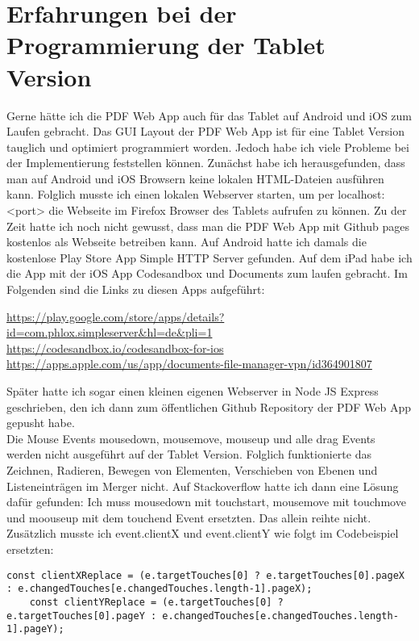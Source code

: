 \section{Erfahrungen bei der Programmierung der Tablet Version}
Gerne hätte ich die PDF Web App auch für das Tablet auf Android und iOS zum Laufen gebracht. Das GUI Layout der PDF Web App ist für eine Tablet Version tauglich und optimiert programmiert worden. Jedoch habe ich viele Probleme bei der Implementierung feststellen können. Zunächst habe ich herausgefunden, dass man auf Android und iOS Browsern keine lokalen HTML-Dateien ausführen kann. Folglich musste ich einen lokalen Webserver starten, um per localhost:<port> die Webseite im Firefox Browser des Tablets aufrufen zu können. Zu der Zeit hatte ich noch nicht gewusst, dass man die PDF Web App mit Github pages kostenlos als Webseite betreiben kann. Auf Android hatte ich damals die kostenlose Play Store App Simple HTTP Server gefunden. Auf dem iPad habe ich die App mit der iOS App Codesandbox und Documents zum laufen gebracht. Im Folgenden sind die Links zu diesen Apps aufgeführt:

\url{https://play.google.com/store/apps/details?id=com.phlox.simpleserver&hl=de&pli=1} \\
\url{https://codesandbox.io/codesandbox-for-ios} \\
\url{https://apps.apple.com/us/app/documents-file-manager-vpn/id364901807}

Später hatte ich sogar einen kleinen eigenen Webserver in Node JS Express geschrieben, den ich dann zum öffentlichen Github Repository der PDF Web App gepusht habe. \\
Die Mouse Events mousedown, mousemove, mouseup und alle drag Events werden nicht ausgeführt auf der Tablet Version. Folglich funktionierte das Zeichnen, Radieren, Bewegen von Elementen, Verschieben von Ebenen und Listeneinträgen im Merger nicht. Auf Stackoverflow hatte ich dann eine Lösung dafür gefunden: Ich muss mousedown mit touchstart, mousemove mit touchmove und moouseup mit dem touchend Event ersetzten. Das allein reihte nicht. Zusätzlich musste ich event.clientX und event.clientY wie folgt im Codebeispiel ersetzten:

\begin{lstlisting}[caption=e.clientX und e.clientY Ersetzung]
	const clientXReplace = (e.targetTouches[0] ? e.targetTouches[0].pageX : e.changedTouches[e.changedTouches.length-1].pageX);
	const clientYReplace = (e.targetTouches[0] ? e.targetTouches[0].pageY : e.changedTouches[e.changedTouches.length-1].pageY);
\end{lstlisting} 

